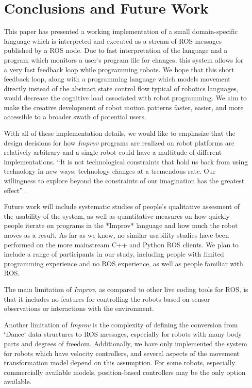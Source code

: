 \documentclass[sigconf]{acmart}
\begin{document}
\section{Conclusions and Future
Work}\label{conclusions-and-future-work}

This paper has presented a working implementation of a small domain-specific
language which is interpreted and executed as a stream of ROS messages published
by a ROS node. Due to fast interpretation of the language and a program which
monitors a user's program file for changes, this system allows for a very fast
feedback loop while programming robots. We hope that this short feedback loop,
along with a programming language which models movement directly instead of the
abstract state control flow typical of robotics languages, would decrease the
cognitive load associated with robot programming. We aim to make the creative
development of robot motion patterns faster, easier, and more accessible to a
broader swath of potential users.

With all of these implementation details, we would like to emphasize
that the design decisions for how \emph{Improv} programs are realized on
robot platforms are relatively arbitrary and a single robot could have a
multitude of different implementations. ``It is not technological
constraints that hold us back from using technology in new ways;
technology changes at a tremendous rate. Our willingness to explore
beyond the constraints of our imagination has the greatest effect''
\cite{schiphorst}.

Future work will include systematic studies of people's qualitative assesment of
the usability of the system, as well as quantitative measures on how quickly
people iterate on programs in the *Improv* language and how much the robot moves
as a result. As far as we know, no similar usability studies have been performed
on the more mainstream C++ and Python ROS clients. We plan to include a range of
participants in our study, including people with limited programming experience
and no ROS experience, as well as people familiar with ROS.

The main limitation of \emph{Improv}, as compared to other live coding tools for
ROS, is that it includes no features for controlling the robots based on sensor
observations or interactions with the environment.

Another limitation of \emph{Improv} is the complexity of defining the conversion
from `Dance` data structures to ROS messages, especially for robots with many
body parts and degrees of freedom. Additionally, we have only implemented the
system for robots which have velocity controllers, and several aspects of the
movement transformation model depend on this assumption. For some robots,
especially commercially available models, position-based controllers may be the
only option available.
\end{document}
